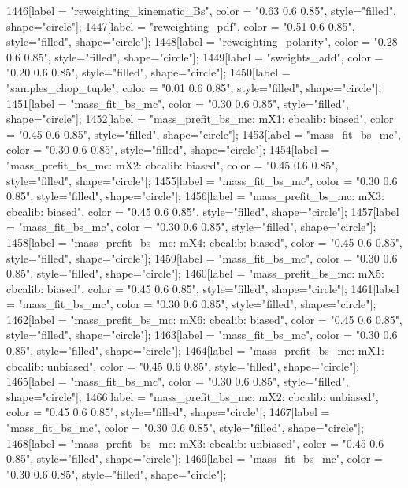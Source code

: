 {	1446[label = "reweighting_kinematic_Bs", color = "0.63 0.6 0.85", style="filled", shape="circle"];
	1447[label = "reweighting_pdf", color = "0.51 0.6 0.85", style="filled", shape="circle"];
	1448[label = "reweighting_polarity", color = "0.28 0.6 0.85", style="filled", shape="circle"];
	1449[label = "sweights_add", color = "0.20 0.6 0.85", style="filled", shape="circle"];
	1450[label = "samples_chop_tuple", color = "0.01 0.6 0.85", style="filled", shape="circle"];
	1451[label = "mass_fit_bs_mc", color = "0.30 0.6 0.85", style="filled", shape="circle"];
	1452[label = "mass_prefit_bs_mc\nmassbin: mX1\nmassmodel: cbcalib\ntrigger: biased", color = "0.45 0.6 0.85", style="filled", shape="circle"];
	1453[label = "mass_fit_bs_mc", color = "0.30 0.6 0.85", style="filled", shape="circle"];
	1454[label = "mass_prefit_bs_mc\nmassbin: mX2\nmassmodel: cbcalib\ntrigger: biased", color = "0.45 0.6 0.85", style="filled", shape="circle"];
	1455[label = "mass_fit_bs_mc", color = "0.30 0.6 0.85", style="filled", shape="circle"];
	1456[label = "mass_prefit_bs_mc\nmassbin: mX3\nmassmodel: cbcalib\ntrigger: biased", color = "0.45 0.6 0.85", style="filled", shape="circle"];
	1457[label = "mass_fit_bs_mc", color = "0.30 0.6 0.85", style="filled", shape="circle"];
	1458[label = "mass_prefit_bs_mc\nmassbin: mX4\nmassmodel: cbcalib\ntrigger: biased", color = "0.45 0.6 0.85", style="filled", shape="circle"];
	1459[label = "mass_fit_bs_mc", color = "0.30 0.6 0.85", style="filled", shape="circle"];
	1460[label = "mass_prefit_bs_mc\nmassbin: mX5\nmassmodel: cbcalib\ntrigger: biased", color = "0.45 0.6 0.85", style="filled", shape="circle"];
	1461[label = "mass_fit_bs_mc", color = "0.30 0.6 0.85", style="filled", shape="circle"];
	1462[label = "mass_prefit_bs_mc\nmassbin: mX6\nmassmodel: cbcalib\ntrigger: biased", color = "0.45 0.6 0.85", style="filled", shape="circle"];
	1463[label = "mass_fit_bs_mc", color = "0.30 0.6 0.85", style="filled", shape="circle"];
	1464[label = "mass_prefit_bs_mc\nmassbin: mX1\nmassmodel: cbcalib\ntrigger: unbiased", color = "0.45 0.6 0.85", style="filled", shape="circle"];
	1465[label = "mass_fit_bs_mc", color = "0.30 0.6 0.85", style="filled", shape="circle"];
	1466[label = "mass_prefit_bs_mc\nmassbin: mX2\nmassmodel: cbcalib\ntrigger: unbiased", color = "0.45 0.6 0.85", style="filled", shape="circle"];
	1467[label = "mass_fit_bs_mc", color = "0.30 0.6 0.85", style="filled", shape="circle"];
	1468[label = "mass_prefit_bs_mc\nmassbin: mX3\nmassmodel: cbcalib\ntrigger: unbiased", color = "0.45 0.6 0.85", style="filled", shape="circle"];
	1469[label = "mass_fit_bs_mc", color = "0.30 0.6 0.85", style="filled", shape="circle"];
}
